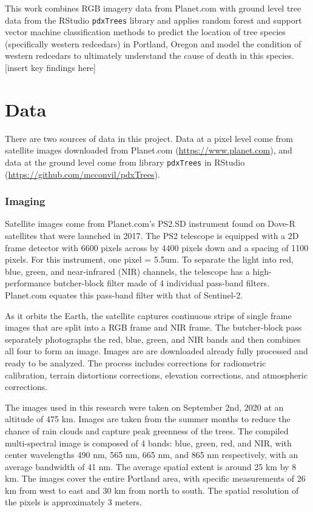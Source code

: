 \documentclass[12pt,twoside]{reedthesis}
\begin{document}
This work combines RGB imagery data from Planet.com with ground level tree data from the RStudio \texttt{pdxTrees} library and applies random forest and support vector machine classification methods to predict the location of tree species (specifically western redcedars) in Portland, Oregon and model the condition of western redcedars to ultimately understand the cause of death in this species. {[}insert key findings here{]}

\hypertarget{data}{%
\chapter{Data}\label{data}}

There are two sources of data in this project. Data at a pixel level come from satellite images downloaded from Planet.com (\url{https://www.planet.com}), and data at the ground level come from library \texttt{pdxTrees} in RStudio (\url{https://github.com/mcconvil/pdxTrees}).

\hypertarget{imaging}{%
\subsection{Imaging}\label{imaging}}

Satellite images come from Planet.com's PS2.SD instrument found on Dove-R satellites that were launched in 2017. The PS2 telescope is equipped with a 2D frame detector with 6600 pixels across by 4400 pixels down and a spacing of 1100 pixels. For this instrument, one pixel = 5.5um. To separate the light into red, blue, green, and near-infrared (NIR) channels, the telescope has a high-performance butcher-block filter made of 4 individual pass-band filters. Planet.com equates this pass-band filter with that of Sentinel-2.

As it orbits the Earth, the satellite captures continuous strips of single frame images that are split into a RGB frame and NIR frame. The butcher-block pass separately photographs the red, blue, green, and NIR bands and then combines all four to form an image. Images are are downloaded already fully processed and ready to be analyzed. The process includes corrections for radiometric calibration, terrain distortions corrections, elevation corrections, and atmospheric corrections.

The images used in this research were taken on September 2nd, 2020 at an altitude of 475 km. Images are taken from the summer months to reduce the chance of rain clouds and capture peak greenness of the trees. The compiled multi-spectral image is composed of 4 bands: blue, green, red, and NIR, with center wavelengths 490 nm, 565 nm, 665 nm, and 865 nm respectively, with an average bandwidth of 41 nm. The average spatial extent is around 25 km by 8 km. The images cover the entire Portland area, with specific measurements of 26 km from west to east and 30 km from north to south. The spatial resolution of the pixels is approximately 3 meters.
\end{document}
